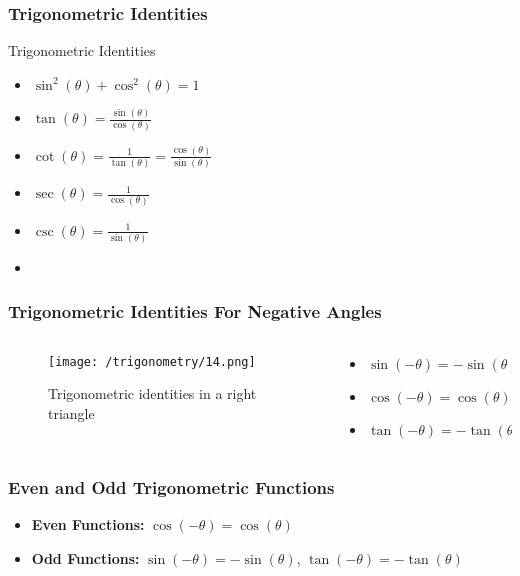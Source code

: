 \documentclass{beamer}
\begin{document}
\begin{frame}
    \frametitle{Trigonometric Identities}
   
    \begin{block}{Trigonometric Identities}
        \begin{itemize}
            \item \(\sin^2(\theta) + \cos^2(\theta) = 1\)
            \item \(\tan(\theta) = \frac{\sin(\theta)}{\cos(\theta)}\)
            \item \(\cot(\theta) = \frac{1}{\tan(\theta)} = \frac{\cos(\theta)}{\sin(\theta)}\)
            \item \(\sec(\theta) = \frac{1}{\cos(\theta)}\)
            \item \(\csc(\theta) = \frac{1}{\sin(\theta)}\)
            \item 
        \end{itemize}
    \end{block}
\end{frame}

\begin{frame}
\frametitle{Trigonometric Identities For Negative Angles}
\begin{columns}
    \begin{column}{0.5\textwidth}
        \begin{figure}
            \centering
            \texttt{[image: /trigonometry/14.png]}
            \caption{Trigonometric identities in a right triangle}
        \end{figure}
    \end{column}
    \begin{column}{0.5\textwidth}
        \begin{block}{}
            \begin{itemize}
                \item \(\sin(-\theta) = -\sin(\theta)\)
                \item \(\cos(-\theta) = \cos(\theta)\)
                \item \(\tan(-\theta) = -\tan(\theta)\)
            \end{itemize}
        \end{block}
    \end{column}
\end{columns}
\end{frame} 

\begin{frame}
    \frametitle{Even and Odd Trigonometric Functions}
    \begin{itemize}
        \item \textbf{Even Functions:} \(\cos(-\theta) = \cos(\theta)\) 
        \item \textbf{Odd Functions:} \(\sin(-\theta) = -\sin(\theta)\), \(\tan(-\theta) = -\tan(\theta) \)
    \end{itemize}   
\end{frame}
\end{document}
